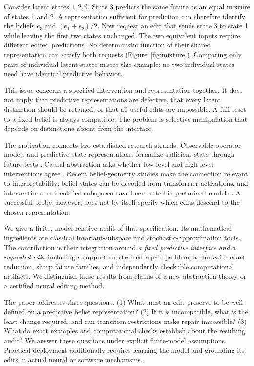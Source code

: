 \documentclass[11pt,letterpaper]{article}
\begin{document}
Consider latent states $1,2,3$. State 3 predicts the same future as an equal mixture of states 1 and 2. A representation sufficient for prediction can therefore identify the beliefs $e_3$ and $(e_1+e_2)/2$. Now request an edit that sends state 3 to state 1 while leaving the first two states unchanged. The two equivalent inputs require different edited predictions. No deterministic function of their shared representation can satisfy both requests (Figure~\ref{fig:mixture}). Comparing only pairs of individual latent states misses this example: no two individual states need have identical predictive behavior.

This issue concerns a specified intervention and representation together. It does not imply that predictive representations are defective, that every latent distinction should be retained, or that all useful edits are impossible. A full reset to a fixed belief is always compatible. The problem is selective manipulation that depends on distinctions absent from the interface.

The motivation connects two established research strands. Observable operator models and predictive state representations formalize sufficient state through future tests \citep{jaeger2000,littman2001,singh2004}. Causal abstraction asks whether low-level and high-level interventions agree \citep{rubenstein2017,geiger2025}. Recent belief-geometry studies make the connection relevant to interpretability: belief states can be decoded from transformer activations, and interventions on identified subspaces have been tested in pretrained models \citep{shai2024,balcells2026}. A successful probe, however, does not by itself specify which edits descend to the chosen representation.

We give a finite, model-relative audit of that specification. Its mathematical ingredients are classical invariant-subspace and stochastic-approximation tools. The contribution is their integration around \emph{a fixed predictive interface and a requested edit}, including a support-constrained repair problem, a blockwise exact reduction, sharp failure families, and independently checkable computational artifacts. We distinguish these results from claims of a new abstraction theory or a certified neural editing method.

The paper addresses three questions. (1) What must an edit preserve to be well-defined on a predictive belief representation? (2) If it is incompatible, what is the least change required, and can transition restrictions make repair impossible? (3) What do exact examples and computational checks establish about the resulting audit? We answer these questions under explicit finite-model assumptions. Practical deployment additionally requires learning the model and grounding its edits in actual neural or software mechanisms.
\end{document}
